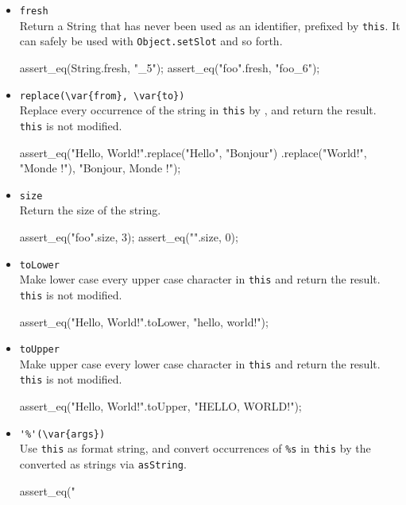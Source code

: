 \begin{itemize}
\item \lstinline|fresh|\\
  Return a String that has never been used as an identifier, prefixed
  by \lstinline|this|.  It can safely be used with
  \lstinline|Object.setSlot| and so forth.
\begin{urbiscript}[firstnumber=last]
assert_eq(String.fresh, "_5");
assert_eq("foo".fresh, "foo_6");
\end{urbiscript}

\item \lstinline|replace(\var{from}, \var{to})|\\
  Replace every occurrence of the string  in
  \lstinline|this| by , and return the result.
  \lstinline|this| is not modified.
\begin{urbiscript}[firstnumber=last]
assert_eq("Hello, World!".replace("Hello", "Bonjour")
                      .replace("World!", "Monde !"),
       "Bonjour, Monde !");
\end{urbiscript}

\item \lstinline|size|\\
  Return the size of the string.
\begin{urbiscript}[firstnumber=last]
assert_eq("foo".size, 3);
assert_eq("".size, 0);
\end{urbiscript}

\item \lstinline|toLower|\\
  Make lower case every upper case character in \lstinline|this| and
  return the result.  \lstinline|this| is not modified.
\begin{urbiscript}[firstnumber=last]
assert_eq("Hello, World!".toLower, "hello, world!");
\end{urbiscript}

\item \lstinline|toUpper|\\
  Make upper case every lower case character in \lstinline|this| and
  return the result.  \lstinline|this| is not modified.
\begin{urbiscript}[firstnumber=last]
assert_eq("Hello, World!".toUpper, "HELLO, WORLD!");
\end{urbiscript}

\item \lstinline|'%'(\var{args})|\\
  Use \lstinline|this| as format string, and convert occurrences of
  \lstinline|%s| in \lstinline|this| by the  converted as
  strings via \lstinline|asString|.
\begin{urbiscript}[firstnumber=last]
assert_eq("%
\end{urbiscript}


\end{itemize}
